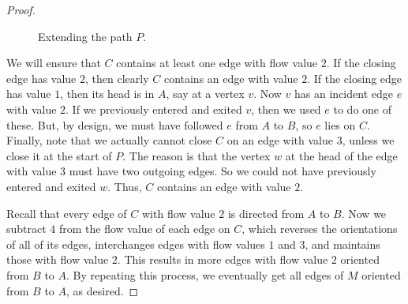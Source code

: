 \documentclass[a4paper,12pt]{article}
\theoremstyle{plain}
\theoremstyle{definition}
\begin{document}
\begin{proof}
\begin{figure}[!t]
	\caption{Extending the path $P$.%
}
\end{figure}

    
    We will ensure that $C$ contains at least one edge with flow value $2$.
    If the closing edge has value $2$, then clearly $C$ contains an edge with value $2$. 
    If the closing edge has value $1$, then its head is in $A$, say at a vertex $v$.  Now $v$ has an incident edge $e$ with value $2$. 
    If we previously entered and exited $v$, then we used $e$
    to do one of these. But, by design, we must have followed $e$ from $A$ to $B$, so $e$ lies on $C$.
	Finally, note that we actually cannot close $C$ on an edge with value $3$, unless we close it at the start of $P$.  The reason is that the vertex $w$ at the head of the edge with value $3$ must have two outgoing edges.  So we could not
	have previously entered and exited $w$.  
    Thus, $C$ contains an edge with value $2$.

	Recall that every edge of $C$ with flow value $2$ is directed from $A$ to $B$.
    Now we subtract $4$ from the flow value of each edge on $C$, which reverses the orientations of all of its edges, interchanges edges with flow values $1$ and $3$, and maintains those with flow value $2$. This results in more edges with flow value $2$ oriented from $B$ to $A$. By repeating this process, we eventually get all edges of $M$ oriented from $B$ to $A$,
	as desired.
\end{proof}
\end{document}
